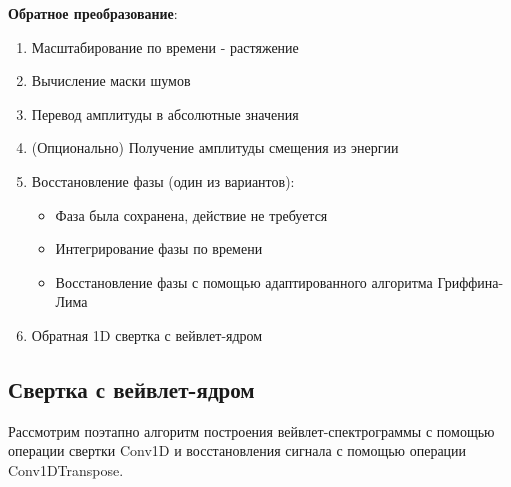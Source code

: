 \textbf{Обратное преобразование}:
\begin{enumerate}[1.]
  \item Масштабирование по времени - растяжение
  \item Вычисление маски шумов
  \item Перевод амплитуды в абсолютные значения
  \item (Опционально) Получение амплитуды смещения из энергии
  \item Восстановление фазы (один из вариантов):
    \begin{itemize}
      \item Фаза была сохранена, действие не требуется
      \item Интегрирование фазы по времени
      \item Восстановление фазы с помощью адаптированного алгоритма Гриффина-Лима
    \end{itemize}
  \item Обратная 1D свертка с вейвлет-ядром
\end{enumerate}


\subsection{Свертка с вейвлет-ядром}

Рассмотрим поэтапно алгоритм построения вейвлет-спектрограммы с помощью операции свертки Conv1D и восстановления сигнала с помощью
операции Conv1DTranspose.

